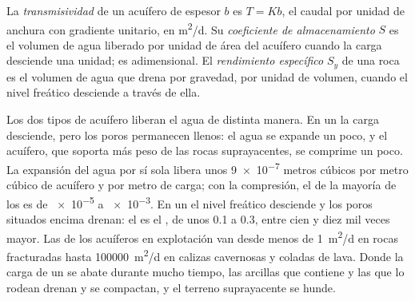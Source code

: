 \begin{definition}\label{def:b3:hydrogeology:storage}
La \emph{transmisividad} de un acuífero de espesor
$b$ es $T = Kb$, el caudal por unidad de anchura con gradiente unitario, en
\unit{m^2/d}. Su \emph{coeficiente de almacenamiento}
$S$ es el volumen de agua liberado por unidad de área del
acuífero cuando la carga desciende una unidad; es adimensional. El
\emph{rendimiento específico} $S_y$ de una roca es el volumen
de agua que drena por gravedad, por unidad de volumen, cuando el nivel
freático desciende a través de ella.
\end{definition}

Los dos tipos de acuífero liberan el agua de distinta manera. En un 
la carga desciende, pero los poros permanecen llenos: el agua se expande un
poco, y el acuífero, que soporta más peso de las rocas suprayacentes,
se comprime un poco. La expansión del agua por sí sola libera unos
\num{9e-7} metros cúbicos por metro cúbico de acuífero y por metro de carga;
con la compresión, el  de la mayoría de los  es
de \num{e-5} a \num{e-3}. En un  el nivel freático desciende y
los poros situados encima drenan: el  es el , de unos 0.1
a 0.3, entre cien y diez mil veces mayor. Las  de
los acuíferos en explotación van desde menos de \qty{1}{m^2/d} en rocas fracturadas
hasta \qty{100000}{m^2/d} en calizas cavernosas y coladas de lava. Donde la
carga de un  se abate durante mucho tiempo, las arcillas que contiene
y las que lo rodean drenan y se compactan, y el terreno suprayacente se hunde.


